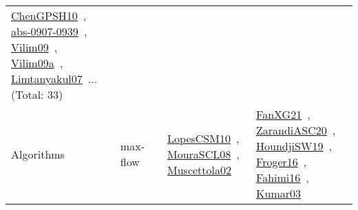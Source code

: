 {\begin{longtable}{lp{3cm}>{\raggedright\arraybackslash}p{6cm}>{\raggedright\arraybackslash}p{6cm}>{\raggedright\arraybackslash}p{8cm}}
\href{works/ChenGPSH10.pdf}{ChenGPSH10}~\cite{ChenGPSH10}, \href{works/abs-0907-0939.pdf}{abs-0907-0939}~\cite{abs-0907-0939}, \href{works/Vilim09.pdf}{Vilim09}~\cite{Vilim09}, \href{works/Vilim09a.pdf}{Vilim09a}~\cite{Vilim09a}, \href{works/Limtanyakul07.pdf}{Limtanyakul07}~\cite{Limtanyakul07}... (Total: 33)\\
Algorithms & max-flow &  & \href{works/LopesCSM10.pdf}{LopesCSM10}~\cite{LopesCSM10}, \href{works/MouraSCL08.pdf}{MouraSCL08}~\cite{MouraSCL08}, \href{works/Muscettola02.pdf}{Muscettola02}~\cite{Muscettola02} & \href{works/FanXG21.pdf}{FanXG21}~\cite{FanXG21}, \href{works/ZarandiASC20.pdf}{ZarandiASC20}~\cite{ZarandiASC20}, \href{works/HoundjiSW19.pdf}{HoundjiSW19}~\cite{HoundjiSW19}, \href{works/Froger16.pdf}{Froger16}~\cite{Froger16}, \href{works/Fahimi16.pdf}{Fahimi16}~\cite{Fahimi16}, \href{works/Kumar03.pdf}{Kumar03}~\cite{Kumar03}\\

\end{longtable}}
